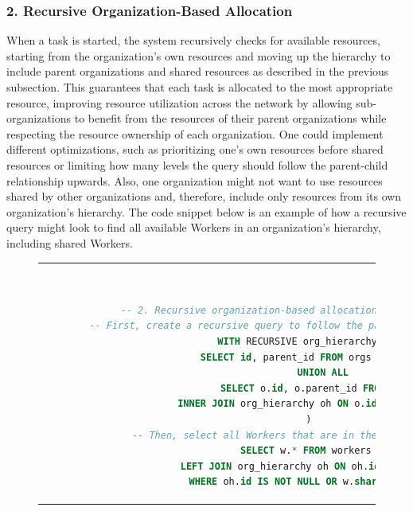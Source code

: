 \subsubsection{2. Recursive Organization-Based Allocation}
    When a task is started, the system recursively checks for available resources, starting from the organization's own resources and moving up the hierarchy to include parent organizations and shared resources as described in the previous subsection. This guarantees that each task is allocated to the most appropriate resource, improving resource utilization across the network by allowing sub-organizations to benefit from the resources of their parent organizations while respecting the resource ownership of each organization. One could implement different optimizations, such as prioritizing one's own resources before shared resources or limiting how many levels the query should follow the parent-child relationship upwards. Also, one organization might not want to use resources shared by other organizations and, therefore, include only resources from its own organization's hierarchy. The code snippet below is an example of how a recursive query might look to find all available Workers in an organization's hierarchy, including shared Workers.   

    \begin{figure}[htpb]
      \begin{tabular}{c}
      \ \small \begin{lstlisting}[language=SQL]
        -- 2. Recursive organization-based allocation example query
        -- First, create a recursive query to follow the parent-child hierarchy upward
        WITH RECURSIVE org_hierarchy AS (
            SELECT id, parent_id FROM orgs WHERE id = ?
            UNION ALL
            SELECT o.id, o.parent_id FROM orgs o
            INNER JOIN org_hierarchy oh ON o.id = oh.parent_id 
        ) 
        -- Then, select all Workers that are in the hierarchy or shared
        SELECT w.* FROM workers w
        LEFT JOIN org_hierarchy oh ON oh.id = w.org_id
        WHERE oh.id IS NOT NULL OR w.shared = true;
        \end{lstlisting}
      \end{tabular}
      \label{fig:recursive-allocation}
    \end{figure}

